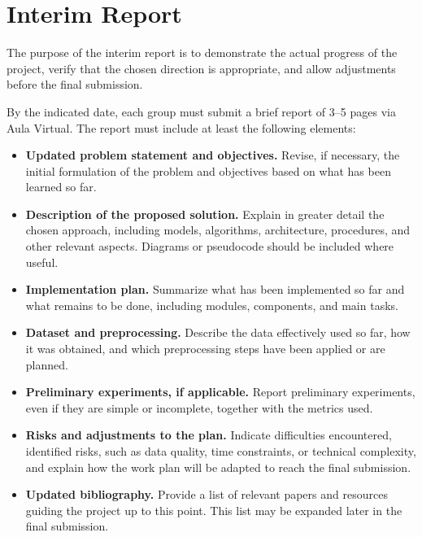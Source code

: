 \section{Interim Report}

The purpose of the interim report is to demonstrate the actual progress of the project, verify that the chosen direction is appropriate, and allow adjustments before the final submission.

By the indicated date, each group must submit a brief report of 3--5 pages via Aula Virtual. The report must include at least the following elements:

\begin{itemize}
    \item \textbf{Updated problem statement and objectives.} Revise, if necessary, the initial formulation of the problem and objectives based on what has been learned so far.

    \item \textbf{Description of the proposed solution.} Explain in greater detail the chosen approach, including models, algorithms, architecture, procedures, and other relevant aspects. Diagrams or pseudocode should be included where useful.

    \item \textbf{Implementation plan.} Summarize what has been implemented so far and what remains to be done, including modules, components, and main tasks.

    \item \textbf{Dataset and preprocessing.} Describe the data effectively used so far, how it was obtained, and which preprocessing steps have been applied or are planned.

    \item \textbf{Preliminary experiments, if applicable.} Report preliminary experiments, even if they are simple or incomplete, together with the metrics used.

    \item \textbf{Risks and adjustments to the plan.} Indicate difficulties encountered, identified risks, such as data quality, time constraints, or technical complexity, and explain how the work plan will be adapted to reach the final submission.

    \item \textbf{Updated bibliography.} Provide a list of relevant papers and resources guiding the project up to this point. This list may be expanded later in the final submission.
\end{itemize}